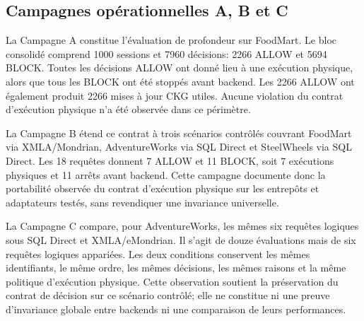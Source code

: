 \subsection{Campagnes opérationnelles A, B et C}

La Campagne A constitue l'évaluation de profondeur sur FoodMart. Le
bloc consolidé comprend 1000 sessions et 7960 décisions: 2266 ALLOW
et 5694 BLOCK. Toutes les décisions ALLOW ont donné lieu à une
exécution physique, alors que tous les BLOCK ont été stoppés avant
backend. Les 2266 ALLOW ont également produit 2266 mises à jour CKG
utiles. Aucune violation du contrat d'exécution physique n'a été
observée dans ce périmètre.

La Campagne B étend ce contrat à trois scénarios contrôlés couvrant
FoodMart via XMLA/Mondrian, AdventureWorks via SQL Direct et
SteelWheels via SQL Direct. Les 18 requêtes donnent 7 ALLOW et
11 BLOCK, soit 7 exécutions physiques et 11 arrêts avant backend.
Cette campagne documente donc la portabilité observée du contrat
d'exécution physique sur les entrepôts et adaptateurs testés, sans
revendiquer une invariance universelle.

La Campagne C compare, pour AdventureWorks, les mêmes six requêtes
logiques sous SQL Direct et XMLA/eMondrian. Il s'agit de douze
évaluations mais de six requêtes logiques appariées. Les deux
conditions conservent les mêmes identifiants, le même ordre, les
mêmes décisions, les mêmes raisons et la même politique d'exécution
physique. Cette observation soutient la préservation du contrat de
décision sur ce scénario contrôlé; elle ne constitue ni une preuve
d'invariance globale entre backends ni une comparaison de leurs
performances.

